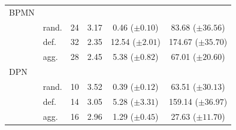 \begin{table}[t]
\begin{tabular}{ll|cccc}
        BPMN & \\ 
             & rand.  & 24 & 3.17 & 0.46 ($\pm{}0.10$) & 83.68 ($\pm{}36.56$) \\ 
             & def.   & 32 & 2.35 & 12.54 ($\pm{}2.01$) & 174.67 ($\pm{}35.70$) \\ 
             & agg.   & 28 & 2.45 & 5.38 ($\pm{}0.82$) & 67.01 ($\pm{}20.60$) \\ 
        DPN & \\
             & rand.  & 10 & 3.52 & 0.39 ($\pm{}0.12$) & 63.51 ($\pm{}30.13$) \\ 
             & def.   & 14 & 3.05 & 5.28 ($\pm{}3.31$) & 159.14 ($\pm{}36.97$) \\ 
             & agg.   & 16 & 2.96 & 1.29 ($\pm{}0.45$) & 27.63 ($\pm{}11.70$) \\ 
    \end{tabular}
\end{table}